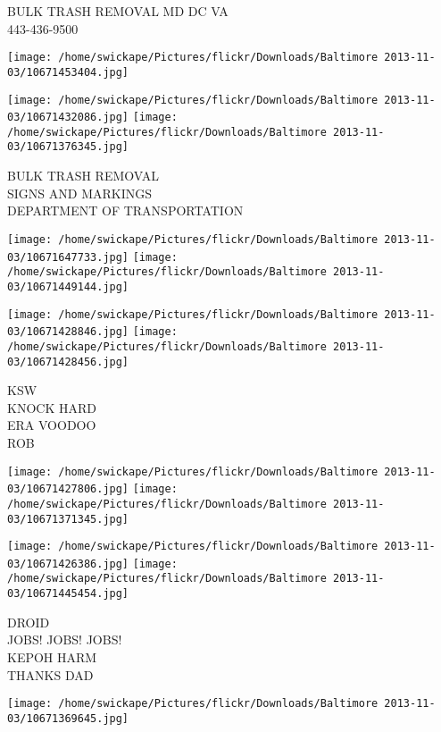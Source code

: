 \documentclass[10pt,letterpaper]{article}
\begin{document}
BULK TRASH REMOVAL MD DC VA\\
443{-}436{-}9500\\
\pagebreak

\texttt{[image: /home/swickape/Pictures/flickr/Downloads/Baltimore 2013-11-03/10671453404.jpg]}

\vspace{0.25in}
\texttt{[image: /home/swickape/Pictures/flickr/Downloads/Baltimore 2013-11-03/10671432086.jpg]}
\texttt{[image: /home/swickape/Pictures/flickr/Downloads/Baltimore 2013-11-03/10671376345.jpg]}

BULK TRASH REMOVAL\\
SIGNS AND MARKINGS\\
DEPARTMENT OF TRANSPORTATION\\
\pagebreak

\texttt{[image: /home/swickape/Pictures/flickr/Downloads/Baltimore 2013-11-03/10671647733.jpg]}
\texttt{[image: /home/swickape/Pictures/flickr/Downloads/Baltimore 2013-11-03/10671449144.jpg]}

\texttt{[image: /home/swickape/Pictures/flickr/Downloads/Baltimore 2013-11-03/10671428846.jpg]}
\texttt{[image: /home/swickape/Pictures/flickr/Downloads/Baltimore 2013-11-03/10671428456.jpg]}

KSW\\
KNOCK HARD\\
ERA VOODOO\\
ROB\\
\pagebreak

\texttt{[image: /home/swickape/Pictures/flickr/Downloads/Baltimore 2013-11-03/10671427806.jpg]}
\texttt{[image: /home/swickape/Pictures/flickr/Downloads/Baltimore 2013-11-03/10671371345.jpg]}

\texttt{[image: /home/swickape/Pictures/flickr/Downloads/Baltimore 2013-11-03/10671426386.jpg]}
\texttt{[image: /home/swickape/Pictures/flickr/Downloads/Baltimore 2013-11-03/10671445454.jpg]}

DROID\\
JOBS! JOBS! JOBS!\\
KEPOH HARM\\
THANKS DAD\\
\pagebreak

\texttt{[image: /home/swickape/Pictures/flickr/Downloads/Baltimore 2013-11-03/10671369645.jpg]}
\end{document}
